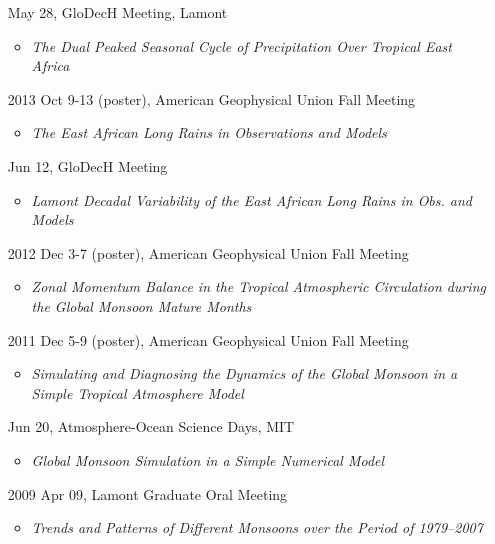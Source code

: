 \documentclass[11pt]{article}
\newcommand{\meetingName}[1]{#1}
\newcommand{\ptitle}[1]{\textit{#1}}
\begin{document}
\begin{itemize}[leftmargin=10ex]
	\item[\phantom{2014}]May 28,  \meetingName{ GloDecH Meeting}, Lamont
	\begin{itemize}[leftmargin=4ex]
		\item \ptitle{The Dual Peaked Seasonal Cycle of Precipitation Over Tropical East Africa}
		\end{itemize}
	
	\item[2013] Oct 9-13 (poster), \meetingName{American Geophysical Union Fall Meeting}
	\begin{itemize}[leftmargin=4ex]
		\item \ptitle{The East African Long Rains in Observations and Models}
		\end{itemize}
	
	\item [\phantom{2013}] Jun 12, \meetingName{GloDecH Meeting}
	\begin{itemize}[leftmargin=4ex]
		\item \ptitle{Lamont Decadal Variability of the East African Long Rains in Obs. and Models}
		\end{itemize}
			
	\item [2012] Dec 3-7 (poster), \meetingName{American Geophysical Union Fall Meeting}
	\begin{itemize}[leftmargin=4ex]
		\item \ptitle{Zonal Momentum Balance in the Tropical Atmospheric Circulation during the Global Monsoon Mature Months}
		\end{itemize}
	
	\item [2011] Dec 5-9 (poster), \meetingName{American Geophysical Union Fall Meeting}
	\begin{itemize}[leftmargin=4ex]
		\item \ptitle{Simulating and Diagnosing the Dynamics of the Global Monsoon in a Simple Tropical Atmosphere Model}
		\end{itemize} 
	 
	\item [\phantom{2011}] Jun 20, \meetingName{Atmosphere-Ocean Science Days}, MIT
	\begin{itemize}[leftmargin=4ex]
		\item \ptitle{Global Monsoon Simulation in a Simple Numerical Model}
		\end{itemize}
	
	\item [2009] Apr 09, \meetingName{Lamont Graduate Oral Meeting}
	\begin{itemize}[leftmargin=4ex]
		\item \ptitle{Trends and Patterns of Different Monsoons over the Period of 1979--2007}
		\end{itemize}
	

\end{itemize}
\end{document}
